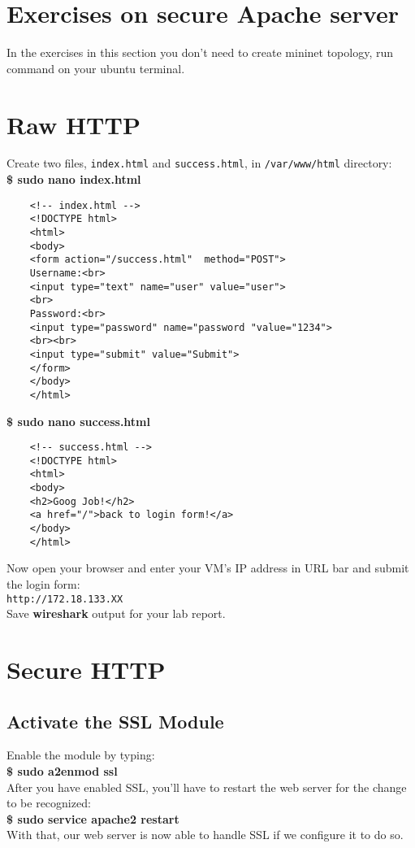 \documentclass[10pt,a4paper]{article}
\numberwithin{equation}{section}
\numberwithin{figure}{section}
\numberwithin{table}{section}
\begin{document}
	\pagebreak
	
	\section*{Exercises on secure Apache server}
	In the exercises in this section you don't need to create mininet topology, run command on your ubuntu terminal.
	\section{Raw HTTP}
	Create two files, \texttt{index.html} and \texttt{success.html}, in \texttt{/var/www/html} directory: \\
	\textbf{\$ sudo nano index.html}
	\begin{verbatim}
	<!-- index.html --> 
	<!DOCTYPE html>
	<html>
	<body>
	<form action="/success.html"  method="POST">
	Username:<br>
	<input type="text" name="user" value="user">
	<br>
	Password:<br>
	<input type="password" name="password "value="1234">
	<br><br>
	<input type="submit" value="Submit">
	</form>
	</body>
	</html>
	\end{verbatim}
	\textbf{\$ sudo nano success.html}
	\begin{verbatim}
	<!-- success.html --> 
	<!DOCTYPE html>
	<html>
	<body>
	<h2>Goog Job!</h2>
	<a href="/">back to login form!</a>
	</body>
	</html>
	\end{verbatim}
	
	Now open your browser and enter your VM's IP address in URL bar and submit the login form:\\
	\texttt{http://172.18.133.XX} \\
	Save \textbf{wireshark} output for your lab report.
	\section{Secure HTTP}
	\subsection{Activate the SSL Module}
	Enable the module by typing: \\
	\textbf{\$ sudo a2enmod ssl} \\
	After you have enabled SSL, you'll have to restart the web server for the change to be recognized: \\
	\textbf{\$ sudo service apache2 restart} \\
	With that, our web server is now able to handle SSL if we configure it to do so. \\
\end{document}
